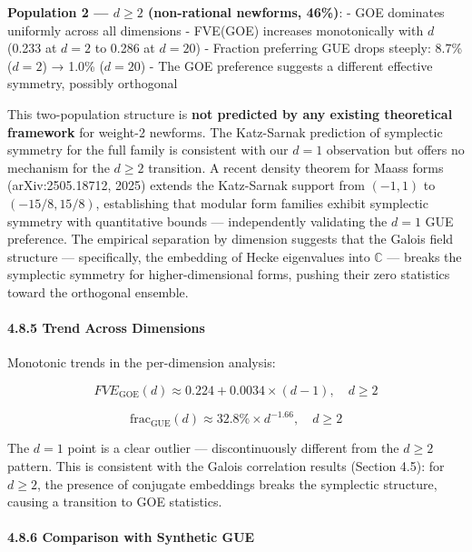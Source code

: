 \documentclass[
]{article}
\begin{document}
\textbf{Population 2 --- \(d \ge 2\) (non-rational newforms, 46\%)}: -
GOE dominates uniformly across all dimensions - FVE(GOE) increases
monotonically with \(d\) (0.233 at \(d=2\) to 0.286 at \(d=20\)) -
Fraction preferring GUE drops steeply: 8.7\% (\(d=2\)) → 1.0\%
(\(d=20\)) - The GOE preference suggests a different effective symmetry,
possibly orthogonal

This two-population structure is \textbf{not predicted by any existing
theoretical framework} for weight-2 newforms. The Katz-Sarnak prediction
of symplectic symmetry for the full family is consistent with our
\(d=1\) observation but offers no mechanism for the \(d\ge 2\)
transition. A recent density theorem for Maass forms (arXiv:2505.18712,
2025) extends the Katz-Sarnak support from \((-1,1)\) to
\((-15/8, 15/8)\), establishing that modular form families exhibit
symplectic symmetry with quantitative bounds --- independently
validating the \(d=1\) GUE preference. The empirical separation by
dimension suggests that the Galois field structure --- specifically, the
embedding of Hecke eigenvalues into \(\mathbb{C}\) --- breaks the
symplectic symmetry for higher-dimensional forms, pushing their zero
statistics toward the orthogonal ensemble.

\hypertarget{trend-across-dimensions}{%
\paragraph{4.8.5 Trend Across
Dimensions}\label{trend-across-dimensions}}

Monotonic trends in the per-dimension analysis:

\[FVE_{\text{GOE}}(d) \approx 0.224 + 0.0034 \times (d-1), \quad d \ge 2\]

\[\text{frac}_{\text{GUE}}(d) \approx 32.8\% \times d^{-1.66}, \quad d \ge 2\]

The \(d=1\) point is a clear outlier --- discontinuously different from
the \(d \ge 2\) pattern. This is consistent with the Galois correlation
results (Section 4.5): for \(d \ge 2\), the presence of conjugate
embeddings breaks the symplectic structure, causing a transition to GOE
statistics.

\hypertarget{comparison-with-synthetic-gue}{%
\paragraph{4.8.6 Comparison with Synthetic
GUE}\label{comparison-with-synthetic-gue}}
\end{document}
